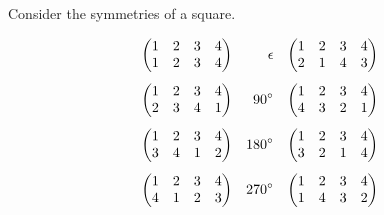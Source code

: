 \documentclass[openany]{report}
\begin{document}
\noindent
Consider the symmetries of a square.
\begin{center}
\end{center}
\begin{align*}
    \begin{pmatrix}
        1 & 2 & 3 & 4\\
        1 & 2 & 3 & 4
    \end{pmatrix} && \epsilon
    && \begin{pmatrix}
        1 & 2 & 3 & 4\\
        2 & 1 & 4 & 3
    \end{pmatrix} \\[1ex]
    \begin{pmatrix}
        1 & 2 & 3 & 4\\
        2 & 3 & 4 & 1
    \end{pmatrix} && 90\degree 
    &&\begin{pmatrix}
        1 & 2 & 3 & 4\\
        4 & 3 & 2 & 1
    \end{pmatrix}\\[1ex]
    \begin{pmatrix}
        1 & 2 & 3 & 4\\
        3 & 4 & 1 & 2
    \end{pmatrix}&& 180\degree
    && \begin{pmatrix}
        1 & 2 & 3 & 4\\
        3 & 2 & 1 & 4
    \end{pmatrix}\\[1ex]
    \begin{pmatrix}
        1 & 2 & 3 & 4\\
        4 & 1 & 2 & 3
    \end{pmatrix}&& 270\degree
    &&\begin{pmatrix}
        1 & 2 & 3 & 4\\
        1 & 4 & 3 & 2
    \end{pmatrix}
\end{align*}
\end{document}
